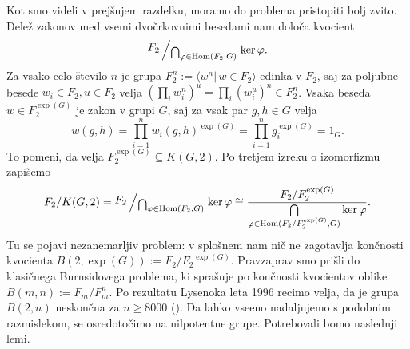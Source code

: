 Kot smo videli v prejšnjem razdelku, moramo do problema pristopiti bolj zvito. Delež zakonov med vsemi dvočrkovnimi besedami nam določa kvocient \begin{equation*}
\bigslant{F_2}{\bigcap_{\varphi \in \operatorname{Hom}(F_2, G)}} \operatorname{ker} \varphi.  
\end{equation*}  
Za vsako celo število $n$ je grupa $F_2^{n} :=  \langle w^{n}  \vert \, w \in F_2 \rangle$ edinka v $F_2$, saj za poljubne besede $w_i \in F_2, u \in  F_2$ velja $(\prod_{i} w_i^n)^u = \prod_{i} (w_i^u)^n \in F_2^n$.
Vsaka beseda $w \in  F_2^{\exp(G)}$ je zakon v grupi $G$, saj za vsak par $g, h \in G$ velja \begin{equation*}
w(g, h) =  \prod_{i = 1}^{n} w_i(g,h)^{\exp(G)} = \prod_{i = 1}^{n} g_i^{\exp(G)} = 1_G.
\end{equation*}  
To pomeni, da velja $F_2^{\exp(G)} \subseteq K(G, 2)$. Po tretjem izreku o izomorfizmu zapišemo
\begin{equation*}
    F_2 / K(G, 2) = \bigslant{F_2}{\bigcap_{\varphi \in \operatorname{Hom}(F_2, G)}} \operatorname{ker} \varphi \cong \dfrac{{F_2} / {F_2^{\exp(G)}}}{\bigcap\limits_{\varphi \in \operatorname{Hom}({F_2} / {F_2^{\exp(G)}}, G)} \ker \varphi}.
\end{equation*}  
Tu se pojavi nezanemarljiv problem: v splošnem nam nič ne zagotavlja končnosti kvocienta $B(2, \exp(G)) := F_2 / {F_2}^{\exp(G)}$. 
Pravzaprav smo prišli do klasičnega Burnsidovega problema, ki sprašuje po končnosti kvocientov oblike $B(m, n) := F_m / F_m^n$.
Po rezultatu Lysenoka leta 1996 recimo velja, da je grupa $B(2, n)$ neskončna za $n \ge 8000$ (\cite[str.~262]{Vaughan-Lee_1999}). 
Da lahko vseeno nadaljujemo s podobnim razmislekom, se osredotočimo na nilpotentne grupe. 
Potrebovali bomo naslednji lemi. 

